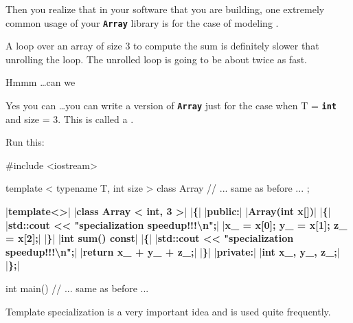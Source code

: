 Then you realize that in your software that you are building, one extremely common usage of your \texttt{\textbf{Array}} library is for the case of modeling .

A loop over an array of size 3 to compute the sum is definitely slower that unrolling the loop. The unrolled loop is going to be about twice as fast.

Hmmm \ldots can we 

Yes you can \ldots you can write a version of \texttt{\textbf{Array}} just for the case when T = \texttt\textbf{int} and size = 3. This is called a \EMPHASIZE{}.

Run this:

\begin{consolethree}[escapeinside=||]
#include <iostream>

template < typename T, int size >
class Array
{     
     // ... same as before ...
};

|\textbf{template<>}|
|\textbf{class Array < int, 3 >}|
|\textbf{\{}|
|\textbf{public:}|
     |\textbf{Array(int x[])}|
     |\textbf{\{}|
          |\textbf{std::cout << "specialization speedup!!!\textbackslash n";}|
          |\textbf{x\_ = x[0]; y\_ = x[1]; z\_ = x[2];}|
     |\textbf{\}}|
     |\textbf{int sum() const}|    
     |\textbf{\{}|
          |\textbf{std::cout << "specialization speedup!!!\textbackslash n";}|
          |\textbf{return x\_ + y\_ + z\_;}|
     |\textbf{\}}|
|\textbf{private:}|
     |\textbf{int x\_, y\_, z\_;}|
|\textbf{\};}|

int main()
{   
     // ... same as before ...
} 
\end{consolethree}
Template specialization is a very important idea and is used quite
frequently.

